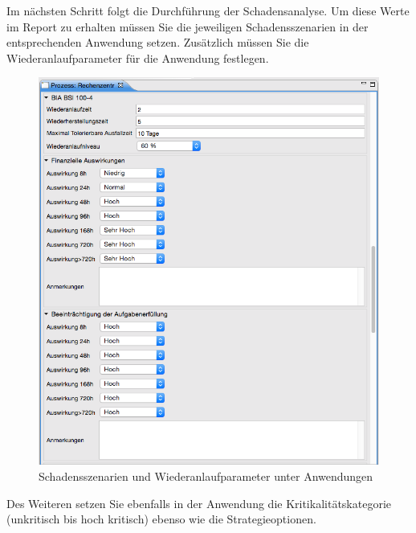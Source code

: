 \documentclass[a4paper,10pt]{book}
\begin{document}
Im nächsten Schritt folgt die Durchführung der Schadensanalyse. Um diese Werte
im Report zu erhalten müssen Sie die jeweiligen Schadensszenarien in der
entsprechenden Anwendung setzen. Zusätzlich müssen Sie die
Wiederanlaufparameter für die Anwendung festlegen.

\begin{figure}[htb!]
  \centering
  \includegraphics[width=\linewidth]{Screenshot/schadensszenarien-und-wiederanlaufparameter-unter-anwendungen.png}
  \caption{Schadensszenarien und Wiederanlaufparameter unter Anwendungen}
  \label{fig:schadensszenarien-und-wiederanlaufparameter-unter-anwendungen}
\end{figure}

Des Weiteren setzen Sie ebenfalls in der Anwendung die Kritikalitätskategorie
(unkritisch bis hoch kritisch) ebenso wie die Strategieoptionen.
\end{document}
